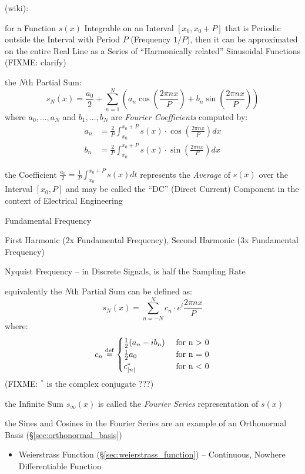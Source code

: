 (wiki):

for a Function $s(x)$ Integrable on an Interval $[x_0,x_0 + P]$ that is
Periodic outside the Interval with Period $P$ (Frequency $1/P$), then it can be
approximated on the entire Real Line as a Series of ``Harmonically related''
Sinusoidal Functions (FIXME: clarify)

the $N$th Partial Sum:
\[
  s_N(x) = \frac{a_0}{2} + \sum_{n=1}^N \left(
    a_n\cos(\frac{2\pi{nx}}{P}) + b_n\sin(\frac{2\pi{nx}}{P})
  \right)
\]
where $a_0,\ldots,a_N$ and $b_1,\ldots,b_N$ are \emph{Fourier Coefficients}
computed by:
\begin{align*}
  a_n & = \frac{2}{P}\int_{x_0}^{x_0+P}s(x) \cdot \cos(\frac{2\pi{nx}}{P}) dx \\
  b_n & = \frac{2}{P}\int_{x_0}^{x_0+P}s(x) \cdot \sin(\frac{2\pi{nx}}{P}) dx
\end{align*}

the Coefficient $\frac{a_0}{2} = \frac{1}{P}\int_{x_0}^{x_0+P}s(x)dt$ represents
the \emph{Average} of $s(x)$ over the Interval $[x_0,P]$ and may be called the
``DC'' (Direct Current) Component in the context of Electrical Engineering

Fundamental Frequency

First Harmonic (2x Fundamental Frequency), Second Harmonic (3x Fundamental
Frequency)

Nyquist Frequency -- in Discrete Signals, is half the Sampling Rate

equivalently the $N$th Partial Sum can be defined as:
\[
  s_N(x) = \sum_{n=-N}^N c_n \cdot e^i\frac{2\pi{nx}}{P}
\]
where:
\[
  c_n \stackrel{\mathrm{def}}= \begin{cases}
    \frac{1}{2}(a_n - ib_n) &\ \text{for n > 0} \\
    \frac{1}{2}a_0          &\ \text{for n = 0} \\
    c_{|n|}^*               &\ \text{for n < 0}
  \end{cases}
\]
(FIXME: $^*$ is the complex conjugate ???)

the Infinite Sum $s_\infty(x)$ is called the \emph{Fourier Series}
representation of $s(x)$

the Sines and Cosines in the Fourier Series are an example of an Orthonormal
Basis (\S\ref{sec:orthonormal_basis})

\begin{itemize}
  \item Weierstrass Function (\S\ref{sec:weierstrass_function}) -- Continuous,
    Nowhere Differentiable Function
\end{itemize}


